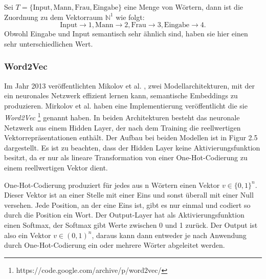 \documentclass[12pt,letterpaper,ngerman]{article}
\begin{document}
\begin{example}
  Sei $T = \{\text{Input}, \text{Mann}, \text{Frau},
   \text{Eingabe}\}$ eine Menge von Wörtern, dann ist die Zuordnung
  zu dem Vektorraum $\mathbb{N}^1$ wie folgt:
  \[
    \text{Input} \to 1, 
    \text{Mann} \to 2, 
    \text{Frau} \to 3,
    \text{Eingabe} \to 4.
  \]
  Obwohl Eingabe und Input semantisch sehr ähnlich sind, haben sie hier
  einen sehr unterschiedlichen Wert.
\end{example}
\subsubsection{Word2Vec}
Im Jahr 2013 veröffentlichten Mikolov et al.  
\cite{word2vec},
zwei Modellarchitekturen, mit der ein
neuronales Netzwerk effizient lernen kann, semantische Embeddings
zu produzieren.
Mirkolov et al. haben eine Implementierung veröffentlicht die sie 
\textit{Word2Vec} \footnote{https://code.google.com/archive/p/word2vec/}
genannt haben.
In beiden Architekturen besteht das neuronale Netzwerk aus einem 
Hidden Layer, der nach dem Training die reellwertigen 
Vektorrepräsentationen enthält.
Der Aufbau bei beiden Modellen ist in Figur 2.5 dargestellt.
Es ist zu beachten, dass der Hidden Layer keine Aktivierungsfunktion 
besitzt, da er nur als lineare Transformation von einer 
One-Hot-Codierung zu einem reellwertigen Vektor dient.

One-Hot-Codierung produziert für jedes aus n Wörtern einen Vektor
$v \in \{0,1\}^n$. Dieser Vektor ist an einer Stelle mit einer Eins
und sonst überall mit einer Null versehen. Jede Position, an der eine
Eins ist, gibt es nur einmal und codiert so durch die Position ein Wort.
Der Output-Layer hat als Aktivierungsfunktion einen Softmax, der 
Softmax gibt Werte zwischen 0 und 1 zurück. Der Output ist also ein 
Vektor $v \in (0,1)^n$, daraus kann dann entweder je nach Anwendung 
durch One-Hot-Codierung ein oder mehrere Wörter abgeleitet werden.
\end{document}

